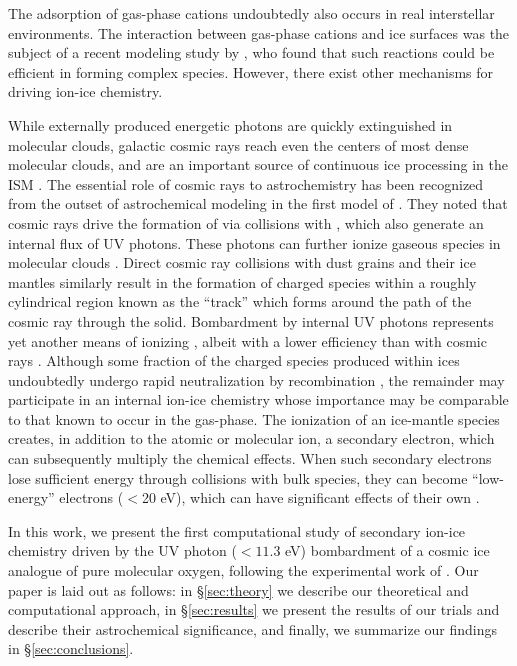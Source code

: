\documentclass[journal=aesccq,manuscript=article,layout=twocolumn]{achemso}
\begin{document}
The adsorption of gas-phase cations undoubtedly also occurs in real interstellar environments. The interaction between gas-phase cations and ice surfaces was the subject of a recent modeling study by \citet{cui_exploring_2024}, who found that such reactions could be efficient in forming complex species. However, there exist other mechanisms for driving ion-ice chemistry. 

While externally produced energetic photons are quickly extinguished in molecular clouds, galactic cosmic rays reach even the centers of most dense molecular clouds\citep{ivlev_penetration_2018}, and are an important source of continuous ice processing in the ISM \citep{strazzulla_ion_2009,dartois_cosmic_2018}.  The essential role of cosmic rays to astrochemistry has been recognized from the outset of astrochemical modeling in the first model of \citet{herbst_formation_1973}. They noted that cosmic rays drive the formation of  via collisions with , which also generate an internal flux of UV photons. These photons can further ionize gaseous species in molecular clouds \citep{prasad_uv_1983}.  Direct cosmic ray collisions with dust grains and their ice mantles similarly result in the formation of charged species within a roughly cylindrical region known as the ``track'' \citep{shingledecker_cosmic-ray_2020} which forms around the path of the cosmic ray through the solid.  Bombardment by internal UV photons represents yet another means of ionizing \citep{mullikin_new_2021}, albeit with a lower efficiency than with cosmic rays \citep{wu_role_2024}.  Although some fraction of the charged species produced within ices undoubtedly undergo rapid neutralization by recombination \citep{shingledecker_general_2018,woon_formation_2024}, the remainder may participate in an internal ion-ice chemistry whose importance may be comparable to that known to occur in the gas-phase. The ionization of an ice-mantle species creates, in addition to the atomic or molecular ion, a secondary electron, which can subsequently multiply the chemical effects. When such secondary electrons lose sufficient energy through collisions with bulk species, they can become ``low-energy'' electrons ($<$20 eV), which can have significant effects of their own \citep{arumainayagam_low-energy_2010,boamah_low-energy_2014,boyer_role_2016,wu_role_2024}.

In this work, we present the first computational study of secondary ion-ice chemistry driven by the UV photon ($<11.3$ eV) bombardment of a cosmic ice analogue of pure molecular oxygen, following the experimental work of \citet{gerakines_ultraviolet_1996}. Our paper is laid out as follows: in \S\ref{sec:theory} we describe our theoretical and computational approach, in \S\ref{sec:results} we present the results of our trials and describe their astrochemical significance, and finally, we summarize our findings in \S\ref{sec:conclusions}. 
\end{document}
